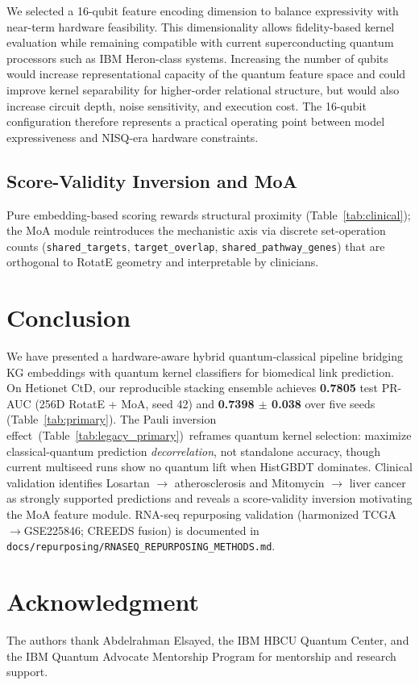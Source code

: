 We selected a 16-qubit feature encoding dimension to balance expressivity with
near-term hardware feasibility. This dimensionality allows fidelity-based
kernel evaluation while remaining compatible with current superconducting
quantum processors such as IBM Heron-class systems. Increasing the number of
qubits would increase representational capacity of the quantum feature space
and could improve kernel separability for higher-order relational structure,
but would also increase circuit depth, noise sensitivity, and execution cost.
The 16-qubit configuration therefore represents a practical operating point
between model expressiveness and NISQ-era hardware constraints.

\subsection{Score-Validity Inversion and MoA}

Pure embedding-based scoring rewards structural proximity
(Table~\ref{tab:clinical}); the MoA module
reintroduces the mechanistic axis via discrete set-operation counts
(\texttt{shared\_targets}, \texttt{target\_overlap}, \texttt{shared\_pathway\_genes})
that are orthogonal to RotatE geometry and interpretable by clinicians.
\fi

\section{Conclusion}

We have presented a hardware-aware hybrid quantum-classical pipeline bridging
KG embeddings with quantum kernel classifiers for biomedical link prediction.
On Hetionet CtD, our reproducible stacking ensemble achieves
\textbf{0.7805} test PR-AUC (256D RotatE + MoA, seed 42) and
\textbf{0.7398 $\pm$ 0.038} over five seeds (Table~\ref{tab:primary}).
The Pauli inversion effect\ifqceshort\else\ (Table~\ref{tab:legacy_primary})\fi\ reframes quantum
kernel selection: maximize classical-quantum prediction \emph{decorrelation},
not standalone accuracy, though current multiseed runs show no quantum lift
when HistGBDT dominates.
Clinical validation identifies Losartan $\to$ atherosclerosis and Mitomycin
$\to$ liver cancer as strongly supported predictions and reveals a
score-validity inversion motivating the MoA feature module.
RNA-seq repurposing validation (harmonized TCGA$\to$GSE225846; CREEDS fusion)
is documented in \texttt{docs/repurposing/RNASEQ\_REPURPOSING\_METHODS.md}.

\section*{Acknowledgment}
The authors thank Abdelrahman Elsayed, the IBM HBCU Quantum Center, and the IBM
Quantum Advocate Mentorship Program for mentorship and research support.




